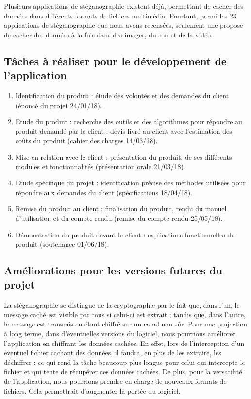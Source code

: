 \documentclass[11pt]{article}
\begin{document}
Plusieurs applications de stéganographie existent déjà, permettant de cacher des
données dans différents formats de fichiers multimédia. Pourtant, parmi les 23
applications de stéganographie que nous avons recensées, seulement une 
propose de cacher des données à la fois dans des images, du son et de la vidéo.

\subsection{Tâches à réaliser pour le développement de l'application}

\footnotesize
\begin {enumerate}
\item Identification du produit : étude des volontés et des demandes du client
    (énoncé du projet 24/01/18).
\item Etude du produit : recherche des outils et des algorithmes pour répondre
    au produit demandé par le client ; devis livré au client avec l'estimation
    des coûts du produit (cahier des charges 14/03/18).
\item Mise en relation avec le client : présentation du produit, de ses
    différents modules et fonctionnalités (présentation orale 21/03/18).
\item Etude spécifique du projet : identification précise des méthodes utilisées
    pour répondre aux demandes du client (spécifications 18/04/18).
\item Remise du produit au client : finalisation du produit, rendu du manuel
    d'utilisation et du compte-rendu (remise du compte rendu 25/05/18).
\item Démonstration du produit devant le client : explications fonctionnelles du
    produit (soutenance 01/06/18).
\end{enumerate}
\small

\subsection{Améliorations pour les versions futures du projet}

La stéganographie se distingue de la cryptographie par le fait que, dans l'un,
le message caché est visible par tous si celui-ci est extrait ; tandis que, dans
l'autre, le message est transmis en étant chiffré sur un canal non-sûr. \newline
Pour une projection à long terme, dans d'éventuelles versions du logiciel, nous
pourrions améliorer l'application en chiffrant les données cachées. En effet,
lors de l'interception d'un éventuel fichier cachant des données, il faudra, en
plus de les extraire, les déchiffrer : ce qui rend la tâche beaucoup plus longue
pour celui qui intercepte le fichier et qui tente de récupérer ces données
cachées. \newline
De plus, pour la versatilité de l'application, nous pourrions prendre en charge
de nouveaux formats de fichiers. Cela permettrait d'augmenter la portée du
logiciel. 
\end{document}
